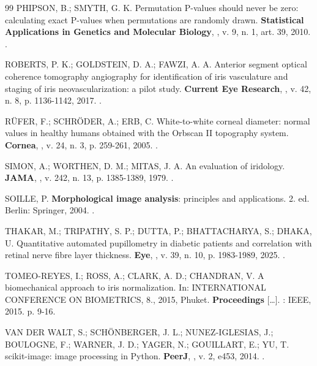 \begin{thebibliography}{99}
PHIPSON, B.; SMYTH, G. K. Permutation P-values should never be zero:
calculating exact P-values when permutations are randomly drawn.
\textbf{Statistical Applications in Genetics and Molecular Biology},
\semlocal, v. 9, n. 1, art. 39, 2010. .

ROBERTS, P. K.; GOLDSTEIN, D. A.; FAWZI, A. A. Anterior segment optical
coherence tomography angiography for identification of iris vasculature and
staging of iris neovascularization: a pilot study. \textbf{Current Eye
Research}, \semlocal, v. 42, n. 8, p. 1136-1142, 2017.
.

RÜFER, F.; SCHRÖDER, A.; ERB, C. White-to-white corneal diameter: normal
values in healthy humans obtained with the Orbscan II topography system.
\textbf{Cornea}, \semlocal, v. 24, n. 3, p. 259-261, 2005.
.

SIMON, A.; WORTHEN, D. M.; MITAS, J. A. An evaluation of iridology.
\textbf{JAMA}, \semlocal, v. 242, n. 13, p. 1385-1389, 1979.
.

SOILLE, P. \textbf{Morphological image analysis}: principles and
applications. 2. ed. Berlin: Springer, 2004.
.

THAKAR, M.; TRIPATHY, S. P.; DUTTA, P.; BHATTACHARYA, S.; DHAKA, U.
Quantitative automated pupillometry in diabetic patients and correlation with
retinal nerve fibre layer thickness. \textbf{Eye}, \semlocal, v. 39, n. 10,
p. 1983-1989, 2025. .

TOMEO-REYES, I.; ROSS, A.; CLARK, A. D.; CHANDRAN, V. A biomechanical approach
to iris normalization. In: INTERNATIONAL CONFERENCE ON BIOMETRICS, 8., 2015,
Phuket. \textbf{Proceedings} [\dots]. \semlocal: IEEE, 2015. p. 9-16.

VAN DER WALT, S.; SCHÖNBERGER, J. L.; NUNEZ-IGLESIAS, J.; BOULOGNE, F.;
WARNER, J. D.; YAGER, N.; GOUILLART, E.; YU, T. scikit-image: image
processing in Python. \textbf{PeerJ}, \semlocal, v. 2, e453, 2014.
.


\end{thebibliography}
